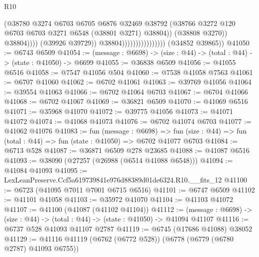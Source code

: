 \begin{lexlean}{R10}
\begin{coremodule}
                                                  (@38780
                                                    @3274
                                                    @6703
                                                    @6705
                                                    @6876
                                                    @32469
                                                    @38792
                                                    (@38766
                                                      @3272
                                                      @120
                                                      @6703
                                                      @6703
                                                      @3271
                                                      @6548
                                                      (@38801 @3271)
                                                      @38804))
                                                  (@38808 @3270))
                                                @38804))))
                                        (@39926 @39729))
                                      @38804))))))))))))))))
      (@34852 @39865))
@41050 := @6743 @6509
@41054 := (message : @6698) -> (size : @44) -> (total : @44) -> (state : @41050) -> @6699
@41055 := @36838 @6509
@41056 := @41055 @6516
@41058 := @7547 @41056 @504
@41060 := @7538 @41058 @7563
@41061 := @6707 @41060
@41062 := @6702 @41061
@41063 := @39769 @41056
@41064 := @39554 @41063
@41066 := @6702 @41064 @6703
@41067 := @6704 @41066
@41068 := @6702 @41067
@41069 := @36821 @6509
@41070 := @41069 @6516
@41071 := @35968 @41070
@41072 := @39775 @41056
@41073 := @41071 @41072
@41074 := @41068 @41073
@41076 := @6702 @41074 @6703
@41077 := @41062 @41076
@41083 := fun (message : @6698) =>
  fun (size : @44) => fun (total : @44) => fun (state : @41050) => @6702 @41077 @6703
@41084 := @6713 @528
@41087 := @36871 @6509 @278 @23685
@41088 := @41087 @6516
@41093 := @38090 (@27257 (@26988 (@6514 @41088 @6548)))
@41094 := @41084 @41093
@41095 := LexLeanPreserve.Ccf5a619739841e976d88389d01de6324.R10.__fits_12
@41100 := @6723 (@41095 @7011 @7001 @6715 @6516)
@41101 := @6747 @6509
@41102 := @41101 @41058
@41103 := @35972 @41070
@41104 := @41103 @41072
@41107 := @41100 (@41087 (@41102 @41104))
@41112 := (message : @6698) -> (size : @44) -> (total : @44) -> (state : @41050) -> @41094 @41107
@41116 := @6737 @528 @41093 @41107 @2787
@41119 := @6745 (@17686 @41088) @38052
@41129 := @41116 @41119 (@6762 (@6772 @528)) (@6778 (@6779 (@6780 @2787) @41093 @6755))

\end{coremodule}
\end{lexlean}
